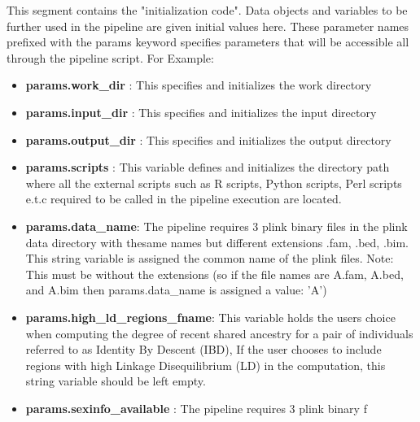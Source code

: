 \documentclass{article}
\begin{document}
This segment contains the "initialization code". Data objects and variables to be further used in the pipeline are given initial values here. These parameter names prefixed with the params keyword specifies parameters that will be accessible all through the pipeline script. For Example:

\begin{itemize}
    \item \textbf{params.work\_dir} : This specifies and initializes the work directory
\end{itemize}
\begin{itemize}
    \item \textbf{params.input\_dir} : This specifies and initializes the input directory
\end{itemize}
\begin{itemize}
    \item \textbf{params.output\_dir} : This specifies and initializes the output directory
\end{itemize}
\begin{itemize}
    \item \textbf{params.scripts} : This variable defines and initializes the directory path where all the external scripts such as R scripts, Python scripts, Perl scripts e.t.c required to be called in the pipeline execution are located.
\end{itemize}
\begin{itemize}
    \item \textbf{params.data\_name}: The pipeline requires 3 plink binary files in the plink data directory with thesame names but different extensions .fam, .bed, .bim. This string variable is assigned the common name of the plink files. Note: This must be without the extensions (so if the file names are A.fam, A.bed, and A.bim then params.data\_name is assigned a value: 'A')
\end{itemize}
\begin{itemize}
    \item \textbf{params.high\_ld\_regions\_fname}: This variable holds the users choice when computing the degree of recent shared ancestry for a pair of individuals referred to as Identity By Descent (IBD), If the user chooses to include regions with high Linkage Disequilibrium (LD) in the computation, this string variable should be left empty.
\end{itemize}
\begin{itemize}
    \item \textbf{params.sexinfo\_available} : The pipeline requires 3 plink binary f 
\end{itemize}
\end{document}

